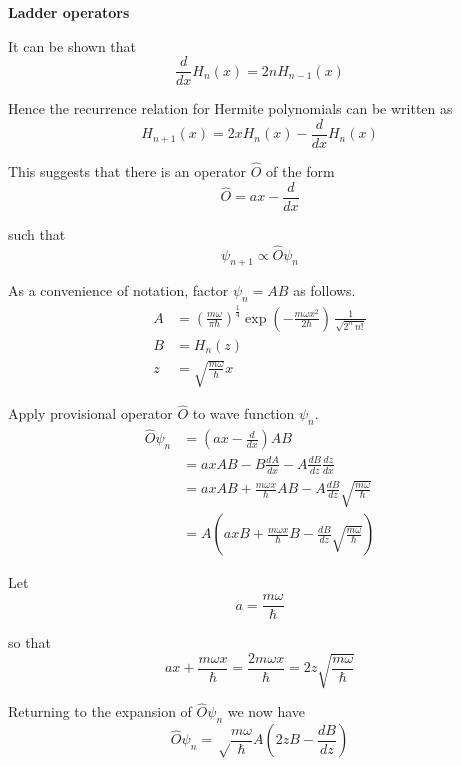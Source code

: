 \documentclass[12pt]{article}
\begin{document}
\bigskip
\noindent
{\bf Ladder operators}

\bigskip
\noindent
It can be shown that
\begin{equation*}
\frac{d}{dx}H_n(x)=2nH_{n-1}(x)
\end{equation*}

\noindent
Hence the recurrence relation for Hermite polynomials can be written as
\begin{equation*}
H_{n+1}(x)=2xH_n(x)-\frac{d}{dx}H_n(x)
\end{equation*}

\noindent
This suggests that there is an operator $\hat{O}$ of the form
\begin{equation*}
\hat{O}=ax-\frac{d}{dx}
\end{equation*}

\noindent
such that
\begin{equation*}
\psi_{n+1}\propto\hat{O}\psi_n
\end{equation*}

\noindent
As a convenience of notation, factor $\psi_n=AB$ as follows.
\begin{align*}
A&=\left(\frac{m\omega}{\pi\hbar}\right)^\frac{1}{4}
\exp\left(-\frac{m\omega x^2}{2\hbar}\right)\,\frac{1}{\sqrt{2^n\,n!}}
\\
B&=H_n(z)
\\
z&=\sqrt{\frac{m\omega}{\hbar}} x
\end{align*}

\noindent
Apply provisional operator $\hat{O}$ to wave function $\psi_n$.
\begin{align*}
\hat{O}\psi_n&=\left(ax-\frac{d}{dx}\right)AB
\\
&=axAB-B\frac{dA}{dx}-A\frac{dB}{dz}\frac{dz}{dx}
\\
&=axAB+\frac{m\omega x}{\hbar}AB-A\frac{dB}{dz}\sqrt{\frac{m\omega}{\hbar}}
\\
&=A\left(axB+\frac{m\omega x}{\hbar}B-\frac{dB}{dz}\sqrt{\frac{m\omega}{\hbar}}\right)
\end{align*}

\noindent
Let
\begin{equation*}
a=\frac{m\omega}{\hbar}
\end{equation*}

\noindent
so that
\begin{equation*}
ax+\frac{m\omega x}{\hbar}=\frac{2m\omega x}{\hbar}=2z\sqrt{\frac{m\omega}{\hbar}}
\end{equation*}

\noindent
Returning to the expansion of $\hat{O}\psi_n$ we now have
\begin{equation*}
\hat{O}\psi_n=\sqrt\frac{m\omega}{\hbar}A\left(2zB-\frac{dB}{dz}\right)
\end{equation*}
\end{document}
